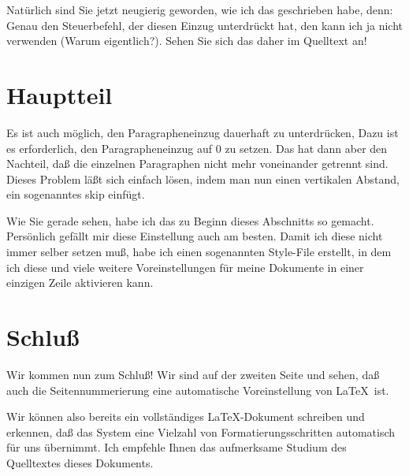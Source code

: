 \documentclass{article}
\begin{document}
Natürlich sind Sie jetzt neugierig geworden, wie ich das geschrieben habe, denn: Genau den Steuerbefehl,
der diesen Einzug unterdrückt hat, den kann ich ja nicht verwenden (Warum eigentlich?).
Sehen Sie sich das daher im Quelltext an!



\section{Hauptteil}

\parskip 0.25cm 
\parindent 0cm

Es ist auch möglich, den Paragrapheneinzug dauerhaft zu unterdrücken, Dazu ist es erforderlich,
den Paragrapheneinzug auf 0 zu setzen. Das hat dann aber den Nachteil, daß die einzelnen Paragraphen nicht
mehr voneinander getrennt sind. Dieses Problem läßt sich einfach lösen, indem man nun einen
vertikalen Abstand, ein sogenanntes skip einfügt.

Wie Sie gerade sehen, habe ich das zu Beginn dieses Abschnitts so gemacht. Persönlich gefällt mir
diese Einstellung auch am besten. Damit ich diese nicht immer selber setzen muß, habe ich einen 
sogenannten Style-File erstellt, in dem ich diese und viele weitere Voreinstellungen für meine Dokumente
in einer einzigen Zeile aktivieren kann.

\section{Schluß}

Wir kommen nun zum Schluß! Wir sind auf der zweiten Seite und sehen, daß auch die Seitennummerierung eine
automatische Voreinstellung von \LaTeX\ ist.

Wir können also bereits ein vollständiges \LaTeX-Dokument schreiben und erkennen, daß das System eine
Vielzahl von Formatierungsschritten automatisch für uns übernimmt. Ich empfehle Ihnen das aufmerksame
Studium des Quelltextes dieses Dokuments.
\end{document}
